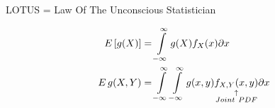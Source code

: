 
\begin{slide}[LOTUS]
LOTUS = Law Of The Unconscious Statistician

\begin{shaded}
\begin{align*}
E\left[g(X)\right]&=\int \limits_{-\infty}^{\infty}g(X)f_{X}(x) \partial x\\
E\, g(X,Y) &= \int \limits_{-\infty}^{\infty}\int \limits_{-\infty}^{\infty}g(x,y)\explain{f_{X,Y}(x,y)}{Joint~PDF}\partial x
\end{align*}
\end{shaded}
\end{slide}